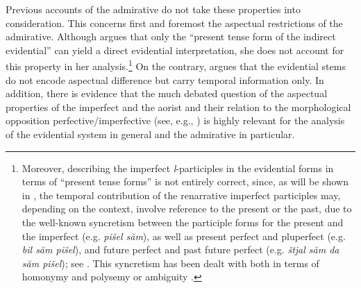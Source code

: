 \documentclass[output=paper,
colorlinks,
citecolor=brown,
newtxmath
]{langscibook}
\begin{document}
Previous accounts of the admirative do not take these properties into consideration. This concerns first and foremost the aspectual restrictions of the admirative. Although \citet[505]{Smirnova2013} argues that only the ``present tense form of the indirect evidential'' can yield a direct evidential interpretation, she does not account for this property in her analysis.\footnote{Moreover, describing the imperfect \textit{l}-participles in the evidential forms in terms of ``present tense forms'' is not entirely correct, since, as will be shown in , the temporal contribution of the renarrative imperfect participles may, depending on the context, involve reference to the present or the past, due to the well-known syncretism between the participle forms for the present and the imperfect (e.g. \textit{pišel săm}), as well as present perfect and pluperfect (e.g. \textit{bil săm pišel}), and future perfect and past future perfect (e.g. \textit{štjal săm da săm pišel}); see \citet[266]{Andrejcin1944}. This syncretism has been dealt with both in terms of homonymy \citep[e.g.][]{Andrejcin1944} and polysemy or ambiguity \citep[e.g.][]{Demina1959}.} On the contrary, \citeauthor{Smirnova2013} argues that the evidential stems do not encode aspectual difference but carry temporal information only. In addition, there is evidence that the much debated question  of the aspectual properties of the imperfect and the aorist and their relation to the morphological opposition perfective/imperfective (see, e.g., \citealt{Demina1976,Sonnenhauser2006}) is highly relevant for the analysis of the  evidential system in general and the admirative in particular.
\end{document}
